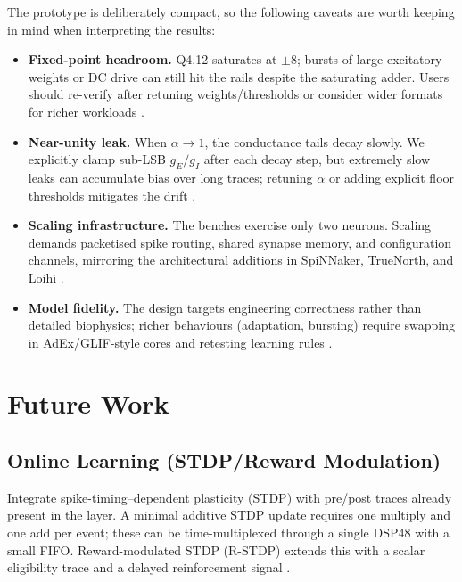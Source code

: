 \documentclass[10pt,onecolumn]{IEEEtran}
\begin{document}
The prototype is deliberately compact, so the following caveats are worth keeping in mind when interpreting the results:
\begin{itemize}
  \item \textbf{Fixed-point headroom.} Q4.12 saturates at \(\pm 8\); bursts of large excitatory weights or DC drive can still hit the rails despite the saturating adder. Users should re-verify after retuning weights/thresholds or consider wider formats for richer workloads \cite{GerstnerKistler2002}.
  \item \textbf{Near-unity leak.} When \(\alpha \rightarrow 1\), the conductance tails decay slowly. We explicitly clamp sub-LSB \(g_E/g_I\) after each decay step, but extremely slow leaks can accumulate bias over long traces; retuning \(\alpha\) or adding explicit floor thresholds mitigates the drift \cite{IndiveriLiu2015}.
  \item \textbf{Scaling infrastructure.} The benches exercise only two neurons. Scaling demands packetised spike routing, shared synapse memory, and configuration channels, mirroring the architectural additions in SpiNNaker, TrueNorth, and Loihi \cite{Furber2014,Merolla2014,Davies2018}.
  \item \textbf{Model fidelity.} The design targets engineering correctness rather than detailed biophysics; richer behaviours (adaptation, bursting) require swapping in AdEx/GLIF-style cores and retesting learning rules \cite{Izhikevich2003}.
\end{itemize}

\section{Future Work}
\label{sec:future}

\subsection{Online Learning (STDP/Reward Modulation)}
Integrate spike-timing–dependent plasticity (STDP) with pre/post traces already present in the layer. A minimal additive STDP update requires one multiply and one add per event; these can be time-multiplexed through a single DSP48 with a small FIFO. Reward-modulated STDP (R-STDP) extends this with a scalar eligibility trace and a delayed reinforcement signal \cite{IndiveriLiu2015}.
\end{document}
